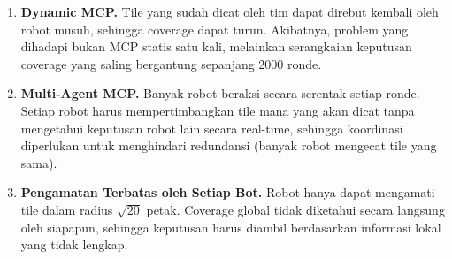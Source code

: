 \begin{enumerate}
  \item \textbf{Dynamic MCP.} Tile yang sudah dicat oleh tim dapat direbut kembali oleh robot musuh, sehingga coverage dapat turun. Akibatnya, problem yang dihadapi bukan MCP statis satu kali, melainkan serangkaian keputusan coverage yang saling bergantung sepanjang 2000 ronde.

  \item \textbf{Multi-Agent MCP.} Banyak robot beraksi secara serentak setiap ronde. Setiap robot harus mempertimbangkan tile mana yang akan dicat tanpa mengetahui keputusan robot lain secara real-time, sehingga koordinasi diperlukan untuk menghindari redundansi (banyak robot mengecat tile yang sama).

  \item \textbf{Pengamatan Terbatas oleh Setiap Bot.} Robot hanya dapat mengamati tile dalam radius $\sqrt{20}$ petak. Coverage global tidak diketahui secara langsung oleh siapapun, sehingga keputusan harus diambil berdasarkan informasi lokal yang tidak lengkap.
\end{enumerate}

